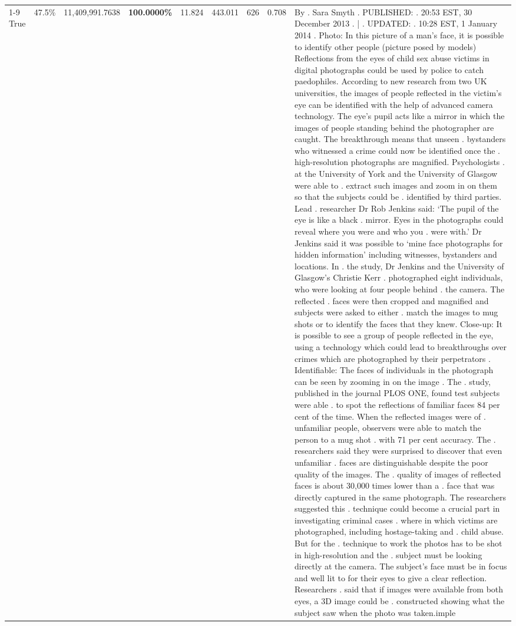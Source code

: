 \begin{table}[H]
\begin{tabular}{lllrlllll}
\cline{1-9}
True & 47.5\% & 11,409,991.7638 & \bfseries \color{red} 100.0000\% & 11.824 & 443.011 & 626 & 0.708 & By . Sara Smyth . PUBLISHED: . 20:53 EST, 30 December 2013 . | . UPDATED: . 10:28 EST, 1 January 2014 . Photo: In this picture of a man's face, it is possible to identify other people (picture posed by models) Reflections from the eyes of child sex abuse victims in digital photographs could be used by police to catch paedophiles. According to new research from two UK universities, the images of people reflected in the victim's eye can be identified with the help of advanced camera technology. The eye's pupil acts like a mirror in which the images of people standing behind the photographer are caught. The breakthrough means that unseen . bystanders who witnessed a crime could now be identified once the . high-resolution photographs are magnified. Psychologists . at the University of York and the University of Glasgow were able to . extract such images and zoom in on them so that the subjects could be . identified by third parties. Lead . researcher Dr Rob Jenkins said: ‘The pupil of the eye is like a black . mirror. Eyes in the photographs could reveal where you were and who you . were with.' Dr Jenkins said it was possible to ‘mine face photographs for hidden information' including witnesses, bystanders and locations. In . the study, Dr Jenkins and the University of Glasgow's Christie Kerr . photographed eight individuals, who were looking at four people behind . the camera. The reflected . faces were then cropped and magnified and subjects were asked to either . match the images to mug shots or to identify the faces that they knew. Close-up: It is possible to see a group of people reflected in the eye, using a technology which could lead to breakthroughs over crimes which are photographed by their perpetrators . Identifiable: The faces of individuals in the photograph can be seen by zooming in on the image . The . study, published in the journal PLOS ONE, found test subjects were able . to spot the reflections of familiar faces 84 per cent of the time. When the reflected images were of . unfamiliar people, observers were able to match the person to a mug shot . with 71 per cent accuracy. The . researchers said they were surprised to discover that even unfamiliar . faces are distinguishable despite the poor quality of the images. The . quality of images of reflected faces is about 30,000 times lower than a . face that was directly captured in the same photograph. The researchers suggested this . technique could become a crucial part in investigating criminal cases . where in which victims are photographed, including hostage-taking and . child abuse. But for the . technique to work the photos has to be shot in high-resolution and the . subject must be looking directly at the camera. The subject's face must be in focus and well lit to for their eyes to give a clear reflection. Researchers . said that if images were available from both eyes, a 3D image could be . constructed showing what the subject saw when the photo was taken.imple \\

\end{tabular}
\end{table}
